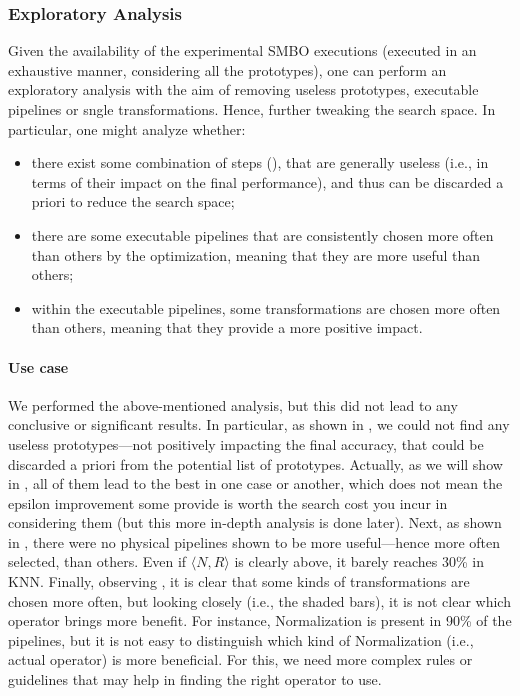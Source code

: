 \subsubsection{Exploratory Analysis}
Given the availability of the experimental SMBO executions (executed in an exhaustive manner, considering all the prototypes), one can perform an exploratory analysis with the aim of removing useless prototypes, executable pipelines or sngle transformations.
Hence, further tweaking the search space.
In particular, one might analyze whether:

\begin{itemize}
    \item there exist some combination of steps (), that are generally useless (i.e., in terms of their impact on the final performance), and thus can be discarded a priori to reduce the search space;
    \item there are some executable pipelines that are consistently chosen more often than others by the optimization, meaning that they are more useful than others;
    \item within the executable pipelines, some transformations are chosen more often than others, meaning that they provide a more positive impact.
    \end{itemize}

\paragraph{Use case}
We performed the above-mentioned analysis, but this did not lead to any conclusive or significant results.
In particular, as shown in , we could not find any useless prototypes---not positively impacting the final accuracy, that could be discarded a priori from the potential list of prototypes.
Actually, as we will show in , all of them lead to the best in one case or another, which does not mean the epsilon improvement some provide is worth the search cost you incur in considering them (but this more in-depth analysis is done later).
Next, as shown in , there were no physical pipelines shown to be more useful---hence more often selected, than others.
Even if $\langle N , R \rangle$ is clearly above, it barely reaches 30\% in KNN.
Finally, observing , it is clear that some kinds of transformations are chosen more often, but looking closely (i.e., the shaded bars), it is not clear which operator brings more benefit.
For instance, Normalization is present in 90\% of the pipelines, but it is not easy to distinguish which kind of Normalization (i.e., actual operator) is more beneficial.
For this, we need more complex rules or guidelines that may help in finding the right operator to use.


